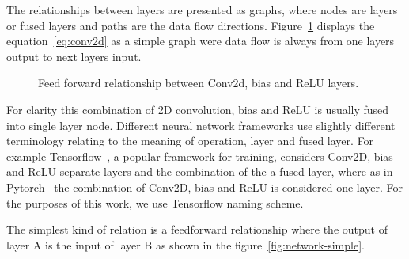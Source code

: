\documentclass[12pt,a4paper,english
]{tunithesis}
\begin{document}
The relationships between layers are presented as graphs, where nodes are layers or fused layers and paths are the data flow directions. Figure~\ref{fig:conv2d-layer} displays the equation~\ref{eq:conv2d} as a simple graph were data flow is always from one layers output to next layers input.

\begin{figure}[ht]
  \centering
  \caption{Feed forward relationship between Conv2d, bias and ReLU layers.}
  \label{fig:conv2d-layer}
\end{figure}
For clarity this combination of 2D convolution, bias and ReLU is usually fused into single layer node. Different neural network frameworks use slightly different terminology relating to the meaning of operation, layer and fused layer. For example Tensorflow~\parencite{tensorflow2015-whitepaper}, a popular framework for training, considers Conv2D, bias and ReLU separate layers and the combination of the a fused layer, where as in Pytorch~\cite{pytorch} the combination of Conv2D, bias and ReLU is considered one layer. For the purposes of this work, we use Tensorflow naming scheme.

The simplest kind of relation is a feedforward relationship where the output of layer A is the input of layer B as shown in the figure~\ref{fig:network-simple}.
\end{document}
